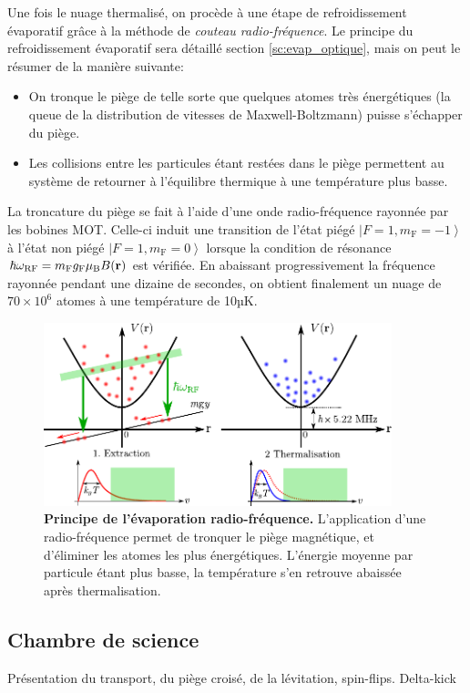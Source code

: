 Une fois le nuage thermalisé, on procède à une étape de refroidissement évaporatif grâce à la méthode de \emph{couteau radio-fréquence}. Le principe du refroidissement évaporatif sera détaillé section \ref{sc:evap_optique}, mais on peut le résumer de la manière suivante:
\begin{itemize}
\item[\textendash]On tronque le piège de telle sorte que quelques atomes très énergétiques (la queue de la distribution de vitesses de Maxwell-Boltzmann) puisse s'échapper du piège.
\item[\textendash]Les collisions entre les particules étant restées dans le piège permettent au système de retourner à l'équilibre thermique à une température plus basse.
\end{itemize}
La troncature du piège se fait à l'aide d'une onde radio-fréquence rayonnée par les bobines MOT. Celle-ci induit une transition de l'état piégé $\left| F=1, m_{\mathrm{F}}=-1 \right\rangle$ à l'état non piégé $\left| F=1, m_{\mathrm{F}}=0 \right\rangle$ lorsque la condition de résonance $\hslash \omega_{\mathrm{RF}} = m_{\mathrm{F}} g_{\mathrm{F}} \mu_{\mathrm{B}} B(\mathbf{r})$ est vérifiée. En abaissant progressivement la fréquence rayonnée pendant une dizaine de secondes, on obtient finalement un nuage de $70 \times 10^6$ atomes à une température de 10µK.

\begin{figure}
\centering
\includegraphics[width=0.9\textwidth]{Fig/BEC_manip/evapRF.pdf}
\caption{\textbf{Principe de l'évaporation radio-fréquence.} L'application d'une radio-fréquence permet de tronquer le piège magnétique, et d'éliminer les atomes les plus énergétiques. L'énergie moyenne par particule étant plus basse, la température s'en retrouve abaissée après thermalisation.}
\label{fig:evapRF}
\end{figure}


\subsection{Chambre de science}
Présentation du transport, du piège croisé, de la lévitation, spin-flips. Delta-kick

